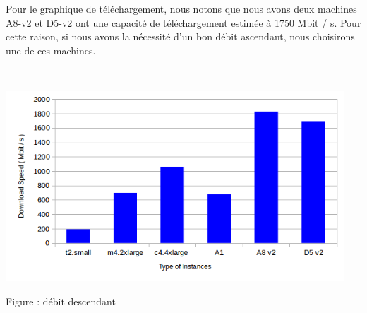 \documentclass[11pt]{article}
\begin{document}
Pour le graphique de téléchargement, nous notons que nous avons deux machines A8-v2 et D5-v2 ont une capacité de téléchargement estimée à 1750 Mbit / s. Pour cette raison, si nous avons la nécessité d'un bon débit ascendant, nous choisirons une de ces machines.



~\\
\centerline{\includegraphics[width=0.95\textwidth]{images/download.png}} %
\centerline{Figure : débit descendant} 
~\\
\end{document}
